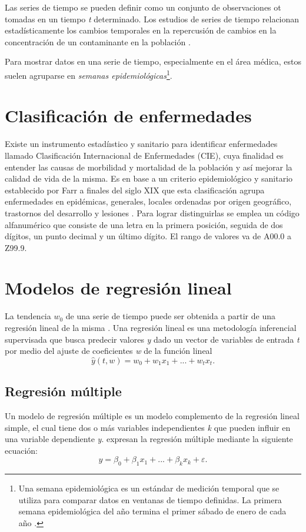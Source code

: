 Las series de tiempo se pueden definir como un conjunto de observaciones {{ot}} tomadas en un tiempo \emph{t} determinado. Los estudios de series de tiempo relacionan estadísticamente los cambios temporales en la repercusión de cambios en la concentración de un contaminante en la población \citep{r8}.

Para mostrar datos en una serie de tiempo, especialmente en el área médica, estos suelen agruparse en \emph{semanas epidemiológicas}\footnote{Una semana epidemiológica es un estándar de medición temporal que se utiliza para comparar datos en ventanas de tiempo definidas. La primera semana epidemiológica del año termina el primer sábado de enero de cada año \citep{r7}.}. 

\section{Clasificación de enfermedades}
Existe un instrumento estadíıstico y sanitario para identificar enfermedades llamado Clasificación Internacional de Enfermedades (CIE), cuya finalidad es entender las causas de morbilidad y mortalidad de la población y así mejorar la calidad de vida de la misma. Es en base a un criterio epidemiológico y sanitario establecido por Farr a finales del siglo XIX que esta clasificación agrupa enfermedades en epidémicas, generales, locales ordenadas por origen geográfico, trastornos del desarrollo y lesiones \citep{r9}. Para lograr distinguirlas se emplea un código alfanumérico que consiste de una letra en la primera posición, seguida de dos dígitos, un punto decimal y un último dígito. El rango de valores va de A00.0 a Z99.9.

\section{Modelos de regresión lineal}
La tendencia \emph{$w_0$} de una serie de tiempo puede ser obtenida a partir de una regresión lineal de la misma \citep{r10}. Una regresión lineal es una metodología inferencial supervisada que busca predecir valores \emph{y} dado un vector de variables de entrada \emph{t} por medio del ajuste de coeficientes \emph{w} de la función lineal 
\begin{equation}
    \hat{y}(t,w) = w_0 + w_1x_1 + ... + w_tx_t.
    \label{eq1}
\end{equation}

\subsection{Regresión múltiple}
Un modelo de regresión múltiple es un modelo complemento de la regresión lineal simple, el cual tiene dos o más variables independientes \emph{k} que pueden influir en una variable dependiente \emph{y}. \citet{r11} expresan la regresión múltiple mediante la siguiente ecuación:
\begin{equation}
    y = \beta_0 + \beta_1x_1 + ... + \beta_kx_k + \varepsilon.
    \label{eq2}
\end{equation}

